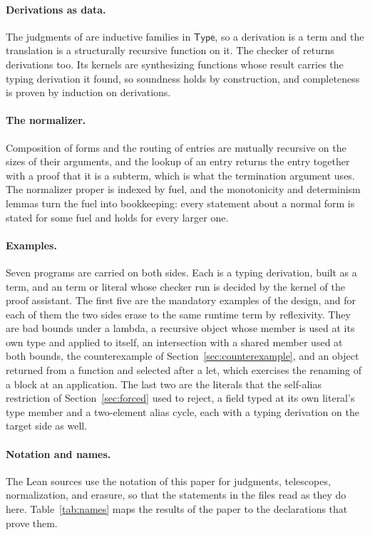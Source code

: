 \paragraph{Derivations as data.}
The judgments of \DOTMNF are inductive families in $\mathsf{Type}$, so a derivation is a term and the translation is a structurally recursive function on it. The checker of \FCdot returns derivations too. Its kernels are synthesizing functions whose result carries the typing derivation it found, so soundness holds by construction, and completeness is proven by induction on derivations.

\paragraph{The normalizer.}
Composition of forms and the routing of entries are mutually recursive on the sizes of their arguments, and the lookup of an entry returns the entry together with a proof that it is a subterm, which is what the termination argument uses. The normalizer proper is indexed by fuel, and the monotonicity and determinism lemmas turn the fuel into bookkeeping: every statement about a normal form is stated for some fuel and holds for every larger one.

\paragraph{Examples.}
Seven programs are carried on both sides. Each is a \DOTMNF typing derivation, built as a term, and an \FCdot term or literal whose checker run is decided by the kernel of the proof assistant. The first five are the mandatory examples of the design, and for each of them the two sides erase to the same runtime term by reflexivity. They are bad bounds under a lambda, a recursive object whose member is used at its own type and applied to itself, an intersection with a shared member used at both bounds, the counterexample of Section~\ref{sec:counterexample}, and an object returned from a function and selected after a let, which exercises the renaming of a block at an application. The last two are the literals that the self-alias restriction of Section~\ref{sec:forced} used to reject, a field typed at its own literal's type member and a two-element alias cycle, each with a typing derivation on the target side as well.

\paragraph{Notation and names.}
The Lean sources use the notation of this paper for judgments, telescopes, normalization, and erasure, so that the statements in the files read as they do here. Table~\ref{tab:names} maps the results of the paper to the declarations that prove them.

